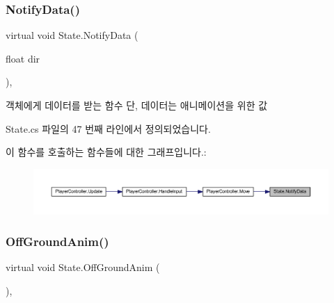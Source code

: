 \subsubsection{\texorpdfstring{NotifyData()}{NotifyData()}}
{\footnotesize\ttfamily virtual void State.\+Notify\+Data (\begin{DoxyParamCaption}\item[{float}]{dir }\end{DoxyParamCaption})\hspace{0.3cm}{\ttfamily [inline]}, {\ttfamily [virtual]}}



객체에게 데이터를 받는 함수 단, 데이터는 애니메이션을 위한 값 



State.\+cs 파일의 47 번째 라인에서 정의되었습니다.


\begin{DoxyCode}{0}

\end{DoxyCode}
이 함수를 호출하는 함수들에 대한 그래프입니다.\+:
\nopagebreak
\begin{figure}[H]
\begin{center}
\leavevmode
\includegraphics[width=350pt]{d0/d8b/class_state_a7c2adea0228ec1582cd5bda7b36d245e_icgraph}
\end{center}
\end{figure}
\mbox{\label{class_state_a2909a234430fa7752fadf2bb993ab5e2}} 
\subsubsection{\texorpdfstring{OffGroundAnim()}{OffGroundAnim()}}
{\footnotesize\ttfamily virtual void State.\+Off\+Ground\+Anim (\begin{DoxyParamCaption}{ }\end{DoxyParamCaption})\hspace{0.3cm}{\ttfamily [inline]}, {\ttfamily [virtual]}}



